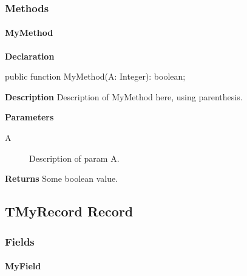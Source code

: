 \documentclass{report}
\begin{document}
\subsubsection*{\large{\textbf{Methods}}\normalsize\hspace{1ex}\hfill}
\paragraph*{MyMethod}\hspace*{\fill}

\begin{list}{}{
\setlength{\itemindent}{0cm}
\setlength{\listparindent}{0cm}
\setlength{\leftmargin}{\evensidemargin}
\addtolength{\leftmargin}{\tmplength}
\settowidth{\labelsep}{X}
\addtolength{\leftmargin}{\labelsep}
\setlength{\labelwidth}{\tmplength}
}
\begin{flushleft}
\item[\textbf{Declaration}\hfill]
\begin{ttfamily}
public function MyMethod(A: Integer): boolean;\end{ttfamily}


\end{flushleft}
\par
\item[\textbf{Description}]
Description of MyMethod here, using parenthesis.  \par
\item[\textbf{Parameters}]
\begin{description}
\item[A] Description of param A.
\end{description}
\item[\textbf{Returns}]Some boolean value.


\end{list}
\subsection*{TMyRecord Record}
\subsubsection*{\large{\textbf{Fields}}\normalsize\hspace{1ex}\hfill}
\paragraph*{MyField}\hspace*{\fill}
\end{document}
